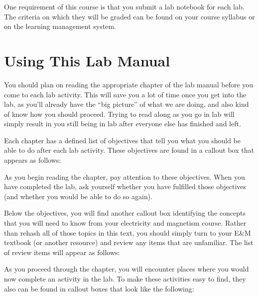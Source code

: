 One requirement of this course is that you submit a lab notebook for each
lab. The criteria on which they will be graded can be found on your course
syllabus or on the learning management system.

\section*{Using This Lab Manual}

You should plan on reading the appropriate chapter of the lab manual before 
you come to each lab activity. This will save you a lot of time once you get
into the lab, as you'll already have the ``big picture'' of what we are doing,
and also kind of know how you should proceed. Trying to read along as you go
in lab will simply result in you still being in lab after everyone else has
finished and left.

Each chapter has a defined list of objectives that tell you what you should
be able to do after each lab activity. These objectives are found in a callout
box that appears as follows:

As you begin reading the chapter, pay attention to these objectives. When you
have completed the lab, ask yourself whether you have fulfilled those 
objectives (and whether you would be able to do so again).

Below the objectives, you will find another callout box identifying the 
concepts that you will need to know from your electricity and magnetism 
course. Rather than rehash all of those topics in this text, you should 
simply turn to your E\&M textbook (or another resource) and review any
items that are unfamiliar. The list of review items will appear as follows:

As you proceed through the chapter, you will encounter places where you 
would now complete an activity in the lab. To make these activities easy to
find, they also can be found in callout boxes that look like the following:

